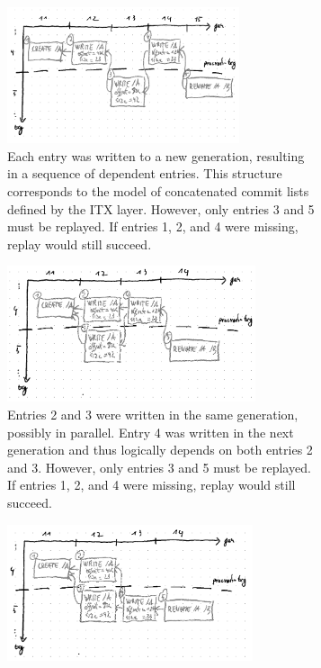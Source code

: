 \documentclass[12pt,a4paper,twoside]{book}
\begin{document}
\begin{figure}[H]
    \begin{subfigure}{\textwidth}
        \centering
        \includegraphics[height=4cm]{fig/prb_logical_structure__seqchain}
        \caption{
            Each entry was written to a new generation, resulting in a sequence of dependent entries.
            This structure corresponds to the model of concatenated commit lists defined by the ITX layer.
            However, only entries 3 and 5 must be replayed.
            If entries 1, 2, and 4 were missing, replay would still succeed.
        }
        \label{fig:prb_logical_structure:seqchain}
    \end{subfigure}
    \begin{subfigure}{\textwidth}
        \centering
        \includegraphics[height=4cm]{fig/prb_logical_structure__diamondchain}
        \caption{
            Entries 2 and 3 were written in the same generation, possibly in parallel.
            Entry 4 was written in the next generation and thus logically depends on both entries 2 and 3.
            However, only entries 3 and 5 must be replayed.
            If entries 1, 2, and 4 were missing, replay would still succeed.
            }
        \label{fig:prb_logical_structure:diamondchain}
    \end{subfigure}
    \begin{subfigure}{\textwidth}
        \centering
        \includegraphics[height=4cm]{fig/prb_logical_structure__diamondchain2}

\end{subfigure}
\end{figure}
\end{document}
